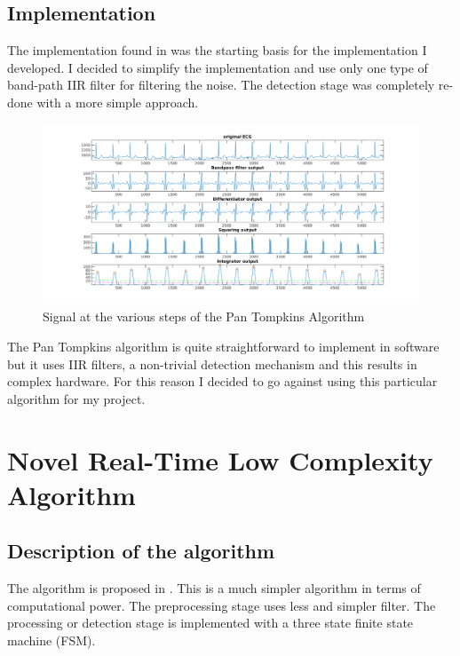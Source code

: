 \documentclass{article}
\begin{document}
\subsection{Implementation}

The implementation found in \cite{hooman} was the starting basis for the implementation I developed. I decided to simplify the implementation and use only one type of band-path IIR filter for filtering the noise. The detection stage was completely re-done with a more simple approach.

\begin{figure}%
        \centerline{\includegraphics[scale=0.6]{./figs/pantompkins.png}}
        \caption{Signal at the various steps of the Pan Tompkins Algorithm}
        \label{fig:pan}
\end{figure}

The Pan Tompkins algorithm is quite straightforward to implement in software but it uses IIR filters, a non-trivial detection mechanism and this results in complex hardware. For this reason I decided to go against using this particular algorithm for my project.

\section{Novel Real-Time Low Complexity Algorithm}

\subsection{Description of the algorithm}

The algorithm is proposed in \cite{rivas}. This is a much simpler algorithm in terms of computational power. The preprocessing stage uses less and simpler filter. The processing or detection stage is implemented with a three state finite state machine (FSM).
\end{document}
